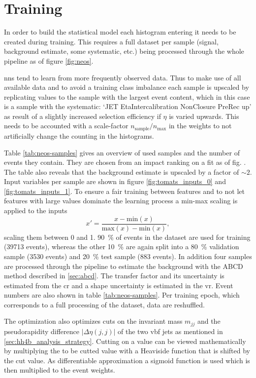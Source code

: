 \section{Training}
In order to build the statistical model each histogram entering it needs to be created during training. This requires a full dataset per sample (signal, background estimate, some systematic, etc.) being processed through the whole pipeline as of figure \ref{fig:neos}.

\acp{nn} tend to learn from more frequently observed data. Thus to make use of all available data and to avoid a training class imbalance each sample is upscaled by replicating values to the sample with the largest event content, which in this case is a sample with the systematic: `JET EtaIntercalibration NonClosure PreRec up' as result of a slightly increased selection efficiency if $\eta$ is varied upwards. This needs to be accounted with a scale-factor $n_\text{sample}/n_\text{max}$ in the weights to not artificially change the counting in the histograms.

Table \ref{tab:neos-samples} gives an overview of used samples and the number of events they contain. They are chosen from an impact ranking on a \mhh fit as of fig. . The table also reveals that the background estimate is upscaled by a factor of $\sim 2$. Input variables per sample are shown in figure \ref{fig:tomats_inputs_0} and \ref{fig:tomats_inputs_1}. To ensure a fair training between features and to not let features with large values dominate the learning process a min-max scaling is applied to the inputs
\begin{equation}
    x'=\frac{x - \text{min}(x)}{\text{max}(x)-\text{min}(x)},
\end{equation}
scaling them between 0 and 1. \qty[]{90}{\percent} of events in the dataset are used for training (39713 events), whereas the other \qty[]{10}{\percent} are again split into a \qty[]{80}{\percent} validation sample (3530 events) and \qty[]{20}{\percent} test sample (883 events). In addition four samples are processed through the pipeline to estimate the background with the ABCD method described in \ref{sec:abcd}. The transfer factor and its uncertainty is estimated from the \ac{cr} and a shape uncertainty is estimated in the \ac{vr}. Event numbers are also shown in table \ref{tab:neos-samples}. Per training epoch, which corresponds to a full processing of the dataset, data are reshuffled.

The optimization also optimizes cuts on the invariant mass $m_{jj}$ and the pseudorapidity difference $|\Delta\eta(j,j)|$ of the two \ac{vbf} jets as mentioned in \ref{sec:hh4b_analysis_strategy}. Cutting on a value can be viewed mathematically by multiplying the to be cutted value with a Heaviside function that is shifted by the cut value. As differentiable approximation a sigmoid function is used which is then multiplied to the event weights.

